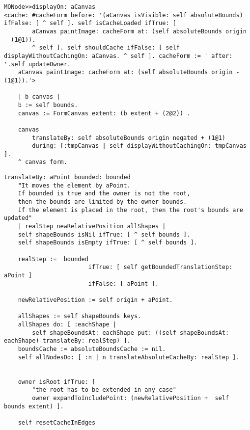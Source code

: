 \documentclass[runningheads]{llncs}
\begin{document}
\begin{lstlisting}
MONode>>displayOn: aCanvas 
<cache: #cacheForm before: '(aCanvas isVisible: self absoluteBounds) ifFalse: [ ^ self ]. self isCacheLoaded ifTrue: [
		aCanvas paintImage: cacheForm at: (self absoluteBounds origin - (1@1)).
		^ self ]. self shouldCache ifFalse: [ self displayWithoutCachingOn: aCanvas. ^ self ]. cacheForm := ' after: '.self updateOwner. 
	aCanvas paintImage: cacheForm at: (self absoluteBounds origin - (1@1)).'>

	| b canvas |
	b := self bounds.	
	canvas := FormCanvas extent: (b extent + (2@2)) .
		
	canvas 
		translateBy: self absoluteBounds origin negated + (1@1) 
		during: [:tmpCanvas | self displayWithoutCachingOn: tmpCanvas ].
	^ canvas form.	
\end{lstlisting}

\begin{lstlisting}
translateBy: aPoint bounded: bounded
	"It moves the element by aPoint. 
	If bounded is true and the owner is not the root, 
	then the bounds are limited by the owner bounds.
	If the element is placed in the root, then the root's bounds are updated"
	| realStep newRelativePosition allShapes |
	self shapeBounds isNil ifTrue: [ ^ self bounds ].
	self shapeBounds isEmpty ifTrue: [ ^ self bounds ].

	realStep :=  bounded 
						ifTrue: [ self getBoundedTranslationStep: aPoint ]
						ifFalse: [ aPoint ].			

	newRelativePosition := self origin + aPoint.	

	allShapes := self shapeBounds keys.
	allShapes do: [ :eachShape | 
		self shapeBoundsAt: eachShape put: ((self shapeBoundsAt: eachShape) translateBy: realStep) ].
	boundsCache := absoluteBoundsCache := nil.
	self allNodesDo: [ :n | n translateAbsoluteCacheBy: realStep ].

	
	owner isRoot ifTrue: [
		"the root has to be extended in any case"
		owner expandToIncludePoint: (newRelativePosition +  self bounds extent) ].
	
	self resetCacheInEdges
\end{lstlisting}
\end{document}
